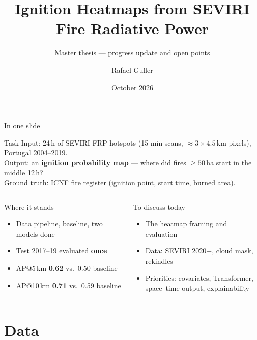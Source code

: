 \documentclass[10pt,aspectratio=169]{beamer}
\title{Ignition Heatmaps from SEVIRI Fire Radiative Power}
\subtitle{Master thesis --- progress update and open points}
\author{Rafael Gufler}
\date{October 2026}
\begin{document}

\begin{frame}[plain]
  \titlepage
\end{frame}

\begin{frame}{In one slide}
  \begin{block}{Task}
    Input: 24\,h of SEVIRI FRP hotspots (15-min scans, $\approx 3 \times 4.5$\,km pixels), Portugal 2004--2019.\\
    Output: an \textbf{ignition probability map} --- where did fires $\geq 50$\,ha start in the middle 12\,h?\\
    Ground truth: ICNF fire register (ignition point, start time, burned area).
  \end{block}
  \begin{columns}[T]
    \begin{exampleblock}{Where it stands}
      \begin{itemize}
        \item Data pipeline, baseline, two models done
        \item Test 2017--19 evaluated \textbf{once}
        \item AP@5\,km \textbf{0.62} vs.\ 0.50 baseline
        \item AP@10\,km \textbf{0.71} vs.\ 0.59 baseline
      \end{itemize}
    \end{exampleblock}
    \begin{alertblock}{To discuss today}
      \begin{itemize}
        \item The heatmap framing and evaluation
        \item Data: SEVIRI 2020+, cloud mask, rekindles
        \item Priorities: covariates, Transformer,\\space--time output, explainability
      \end{itemize}
    \end{alertblock}
  \end{columns}
\end{frame}

\section{Data}
\end{document}
